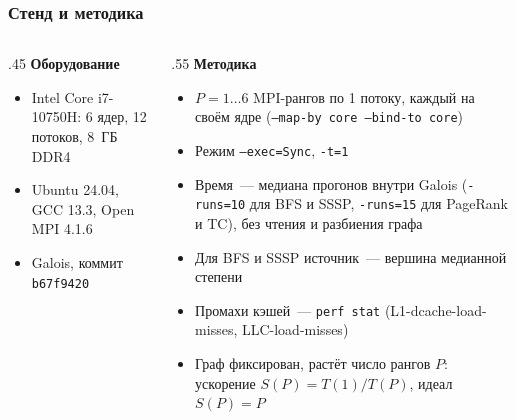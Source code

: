 \documentclass
  [ russian
  , aspectratio=1610
  ] {beamer}
\begin{document}
\begin{frame}
    \frametitle{Стенд и методика}
    \begin{columns}[T]
        \begin{column}{.45\textwidth}
            \textbf{Оборудование}
            \begin{itemize}
                \item Intel Core i7-10750H: 6 ядер, 12 потоков, 8~ГБ DDR4
                \item Ubuntu 24.04, GCC 13.3, Open MPI 4.1.6
                \item Galois, коммит \texttt{b67f9420}
            \end{itemize}
        \end{column}
        \begin{column}{.55\textwidth}
            \textbf{Методика}
            \begin{itemize}
                \item $P = 1\ldots6$ MPI-рангов по 1 потоку, каждый на своём ядре
                      (\texttt{--map-by core --bind-to core})
                \item Режим \texttt{--exec=Sync}, \texttt{-t=1}
                \item Время~--- медиана прогонов внутри Galois
                      (\texttt{-runs=10} для BFS и SSSP, \texttt{-runs=15} для
                      PageRank и TC), без чтения и разбиения графа
                \item Для BFS и SSSP источник~--- вершина медианной степени
                \item Промахи кэшей~--- \texttt{perf stat}
                      (L1-dcache-load-misses, LLC-load-misses)
                \item Граф фиксирован, растёт число рангов $P$:
                      ускорение $S(P) = T(1)/T(P)$, идеал $S(P) = P$
            \end{itemize}
        \end{column}
    \end{columns}
\end{frame}
\end{document}
